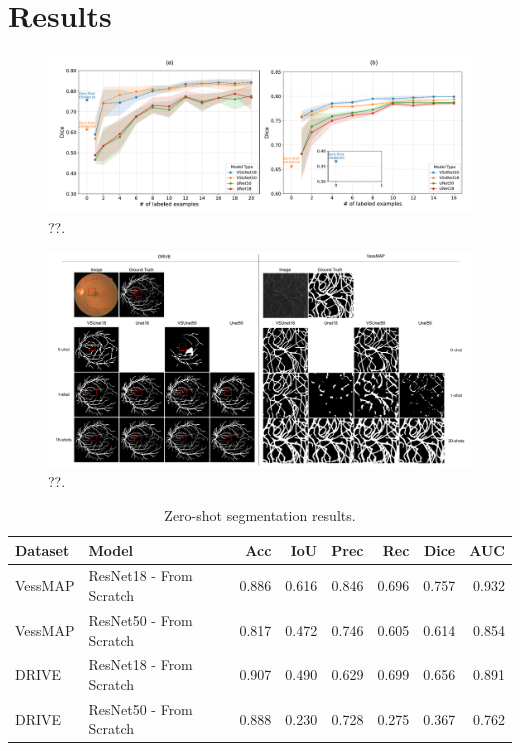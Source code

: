\documentclass[%
reprint,
nofootinbib,
 amsmath,amssymb,
aps,
superscriptaddress,
showkeys,
longbibliography
]{revtex4-1}
\begin{document}
\section{Results}
\label{s:results}

\begin{figure}[tbp]
    \centering
    \includegraphics[width=\textwidth]{figures/results/results_charts.pdf}
    \caption{??.}
    \label{f:results_charts}
\end{figure}


\begin{figure}[tbp]
    \centering
    \includegraphics[width=\textwidth]{figures/results/results_fewshots.pdf}
    \caption{??.}
    \label{f:results_fewshots_drive}
\end{figure}




\begin{table}[t]
\caption{Zero-shot segmentation results.}
\label{tab:zero_shot_results}
\centering
\begingroup
\small
\setlength{\tabcolsep}{3pt}
\renewcommand{\arraystretch}{1.15}
\begin{tabularx}{\textwidth}{l X r r r r r r}
\hline
	\textbf{Dataset} & \textbf{Model} & \textbf{Acc} & \textbf{IoU} & \textbf{Prec} & \textbf{Rec} & \textbf{Dice} & \textbf{AUC} \\
\hline
VessMAP & ResNet18 - From Scratch & 0.886 & 0.616 & 0.846 & 0.696 & 0.757 & 0.932 \\
VessMAP & ResNet50 - From Scratch & 0.817 & 0.472 & 0.746 & 0.605 & 0.614 & 0.854 \\
\hline
DRIVE & ResNet18 - From Scratch & 0.907 & 0.490 & 0.629 & 0.699 & 0.656 & 0.891 \\
DRIVE & ResNet50 - From Scratch & 0.888 & 0.230 & 0.728 & 0.275 & 0.367 & 0.762 \\
\hline
\end{tabularx}
\endgroup
\end{table}
\end{document}
